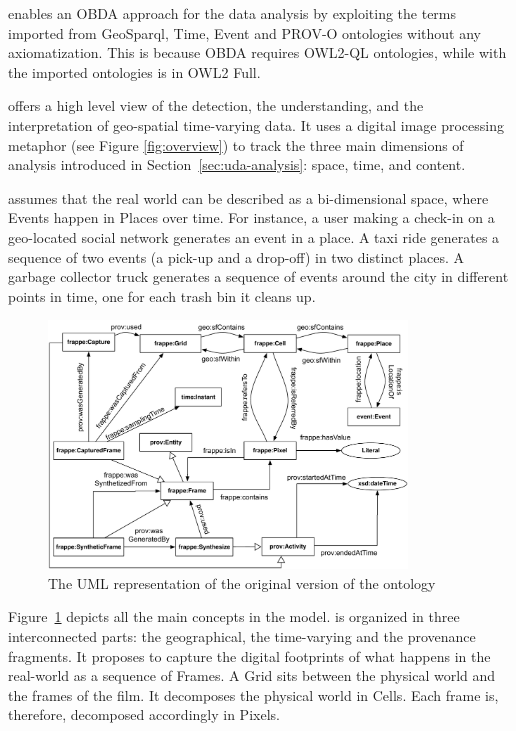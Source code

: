 \frappe{} enables an OBDA approach for the data analysis by exploiting the terms imported from GeoSparql, Time, Event and PROV-O ontologies without any axiomatization. This is because OBDA requires OWL2-QL ontologies, while \frappe{} with the imported ontologies is in OWL2 Full. 

\frappe{} offers a high level view of the detection, the understanding, and the interpretation of geo-spatial time-varying data.
It uses a digital image processing metaphor (see Figure \ref{fig:overview}) to track the three main dimensions of analysis introduced in Section~\ref{sec:uda-analysis}: space, time, and content. 

\frappe{} assumes that the real world can be described as a bi-dimensional space, where \textsf{Event}s happen in \textsf{Place}s over time. For instance, a user making a check-in on a geo-located social network generates an event in a place. A taxi ride generates a sequence of two events (a pick-up and a drop-off) in two distinct places. A garbage collector truck generates a sequence of events around the city in different points in time, one for each trash bin it cleans up.

\begin{figure}[t]
\centering
\includegraphics[width=0.85\textwidth]{img/conceptual-model-original-core}
\caption{The UML representation of the original version of the \frappe{} ontology}
\label{fig:original-core}
\end{figure} 

Figure~\ref{fig:original-core} depicts all the main concepts in the model.
\frappe{} is organized in three interconnected parts: the geographical, the time-varying and the provenance fragments.
It proposes to capture the digital footprints of what happens in the real-world as a sequence of \textsf{Frame}s. A \textsf{Grid} sits between the physical world and the frames of the film. It decomposes the physical world in \textsf{Cell}s. Each frame is, therefore, decomposed accordingly in \textsf{Pixel}s.

